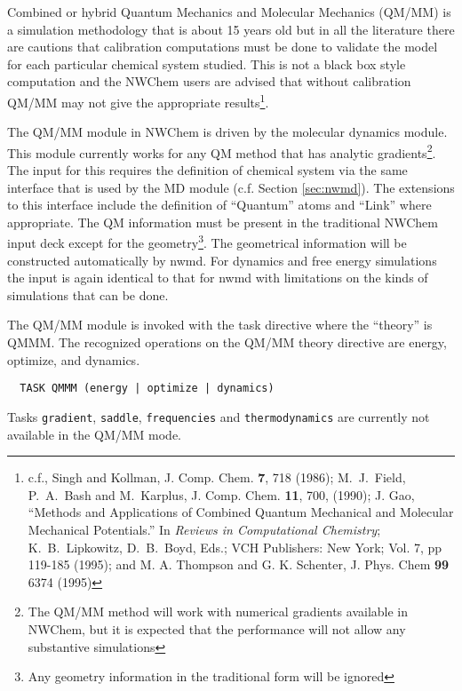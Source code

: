 
\label{sec:qmmm}

Combined or hybrid Quantum Mechanics and Molecular Mechanics (QM/MM)
is a simulation methodology that is about 15 years old but in all the
literature there are cautions that calibration computations must be
done to validate the model for each particular chemical system
studied.  This is not a black box style computation and the NWChem
users are advised that without calibration QM/MM may not give the
appropriate results\footnote{c.f., Singh and Kollman, J. Comp. Chem.
  {\bf 7}, 718 (1986); M.~J.~Field, P.~A.~Bash and M.~Karplus, J.
  Comp. Chem. {\bf 11}, 700, (1990); J. Gao, ``Methods and
  Applications of Combined Quantum Mechanical and Molecular Mechanical
  Potentials.'' In {\it Reviews in Computational Chemistry};
  K.~B.~Lipkowitz, D.~B.~Boyd, Eds.; VCH Publishers: New York;
  Vol. 7, pp 119-185 (1995); and M. A. Thompson and G. K. Schenter, J.
  Phys. Chem {\bf 99} 6374 (1995) }.

The QM/MM module in NWChem is driven by the molecular dynamics module.
This module currently works for any QM method that has
analytic gradients\footnote{The QM/MM method will work with numerical
  gradients available in NWChem, but it is expected that the
  performance will not allow any substantive simulations}.  The input
for this requires the definition of chemical system via the same
interface that is used by the MD module (c.f. Section
\ref{sec:nwmd}).  The extensions to this interface include the
definition of ``Quantum'' atoms and ``Link'' where appropriate.  The
QM information must be present in the traditional NWChem input deck
except for the geometry\footnote{Any geometry information in the
  traditional form will be ignored}.  The geometrical information will
be constructed automatically by nwmd.  For dynamics and free energy
simulations the input is again identical to that for nwmd with
limitations on the kinds of simulations that can be done.

The QM/MM module is invoked with the task directive where the
``theory'' is QMMM.  The recognized operations on the QM/MM theory
directive are energy, optimize, and dynamics.

\begin{verbatim}
  TASK QMMM (energy | optimize | dynamics)
\end{verbatim}

Tasks \verb+gradient+, \verb+saddle+, \verb+frequencies+ and
\verb+thermodynamics+ are currently not available in the QM/MM mode.  


